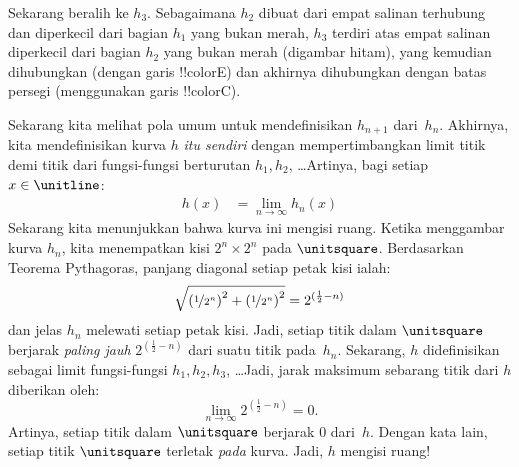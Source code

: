 \documentclass[../../../include/open-logic-section]{subfiles}
\begin{document}
Sekarang beralih ke $h_3$. Sebagaimana $h_2$ dibuat dari empat salinan
terhubung dan diperkecil dari bagian $h_1$ yang bukan merah, $h_3$ terdiri
atas empat salinan diperkecil dari bagian $h_2$ yang bukan merah (digambar
hitam), yang kemudian dihubungkan (dengan garis !!{colorE}) dan akhirnya
dihubungkan dengan batas persegi (menggunakan garis !!{colorC}).
\begin{center}
\end{center}
Sekarang kita melihat pola umum untuk mendefinisikan $h_{n+1}$ dari~$h_n$.
Akhirnya, kita mendefinisikan kurva $h$ \emph{itu sendiri} dengan
mempertimbangkan limit titik demi titik dari fungsi-fungsi berturutan
$h_1,h_2$, \dots\@ Artinya, bagi setiap $x\in\unitline$:
\begin{align*}
	h(x) &= \lim_{n \rightarrow \infty} h_n(x)
\end{align*}
Sekarang kita menunjukkan bahwa kurva ini mengisi ruang. Ketika menggambar
kurva $h_n$, kita menempatkan kisi $2^n\times2^n$ pada $\unitsquare$.
Berdasarkan Teorema Pythagoras, panjang diagonal setiap petak kisi ialah:
\[
\sqrt{\left(\nicefrac{1}{2^{n}}\right)^2+
\left(\nicefrac{1}{2^{n}}\right)^2} = 2^{(\frac{1}{2}-n)}
\]
dan jelas $h_n$ melewati setiap petak kisi. Jadi, setiap titik dalam
$\unitsquare$ berjarak \emph{paling jauh} $2^{(\frac{1}{2}-n)}$ dari suatu
titik pada~$h_n$. Sekarang, $h$ didefinisikan sebagai limit fungsi-fungsi
$h_1,h_2,h_3$, \dots\@ Jadi, jarak maksimum sebarang titik dari $h$
diberikan oleh:
\[
\lim_{n \rightarrow \infty} 2^{(\frac{1}{2}-n)} = 0.
\]
Artinya, setiap titik dalam $\unitsquare$ berjarak $0$ dari~$h$. Dengan kata
lain, setiap titik $\unitsquare$ terletak \emph{pada} kurva. Jadi, $h$
mengisi ruang!{}
\end{document}
